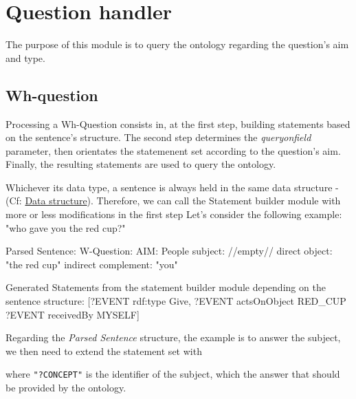 \documentclass[twoside,a4paper,10pt]{report}
\begin{document}
\section{Question handler}
\label{a4cdd8fe503540d93470f621230c7afc}%

The purpose of this module is to query the ontology regarding the question's aim and type.


\subsection{Wh-question}
\label{9d6af810a2fa23183549f6d43eac05eb}%

Processing a Wh-Question consists in, at the first step, building statements based on the sentence's structure. 
The second step determines the \textsl{query{\textunderscore}on{\textunderscore}field} parameter, then orientates the statemenent set according to the question's aim. 
Finally, the resulting statements are used to query the ontology.

Whichever its data type, a sentence is always held in the same data structure - (Cf: \hyperref[c8f6850ec2ec3fb32f203c1f4e3c2fd2]{Data structure}).
Therefore, we can call the Statement builder module with more or less modifications in the first step
Let's consider the following example: "who gave you the red cup?"


\small
\begin{verbatimtab}
 
   Parsed Sentence:
     W-Question:
     AIM: People
     subject: 			  //empty//
     direct object:  	   "the red cup"
     indirect complement:  "you"
   
   Generated Statements from the statement builder module depending on the sentence structure:
     [?EVENT rdf:type Give, 
      ?EVENT actsOnObject RED_CUP
      ?EVENT receivedBy MYSELF]
     
\end{verbatimtab}
\normalsize
Regarding the \textsl{Parsed Sentence} structure, the example is to answer the subject, we then need to extend the statement set with


\small
\begin{verbatimtab}
\end{verbatimtab}
\normalsize

where \texttt{"?CONCEPT"} is the identifier of the subject, which the answer that should be provided by the ontology.
\end{document}
